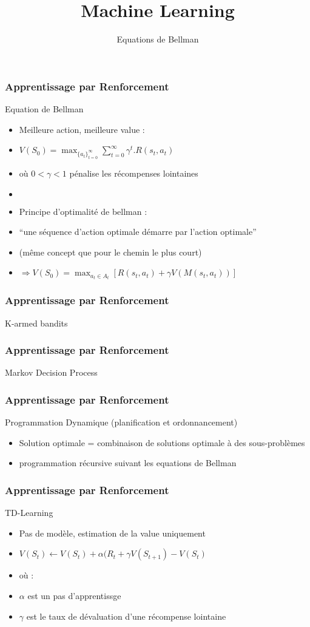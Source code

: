 \documentclass{formation}
\title{Machine Learning}
\subtitle{Equations de Bellman}
\begin{document}
\maketitle


\begin{frame}
  \frametitle{Apprentissage par Renforcement}
  Equation de Bellman
  \begin{itemize}
  \item Meilleure action, meilleure value :
  \item $V(S_0) = \max_{{\{a_t\}}_{t=0}^{\infty}}{\sum_{t=0}^{\infty}}\gamma^t.R(s_t,a_t)$
  \item où $0 < \gamma < 1$ pénalise les récompenses lointaines
  \item $\;$
  \item Principe d'optimalité de bellman :
  \item ``une séquence d'action optimale démarre par l'action optimale''
  \item (même concept que pour le chemin le plus court)
  \item $\Rightarrow V(S_0) = \max_{a_t \in A_t}[{R(s_t,a_t)+\gamma V(M(s_t,a_t))}]$
  \end{itemize}
\end{frame}



\begin{frame}
  \frametitle{Apprentissage par Renforcement}
  K-armed bandits
\end{frame}

\begin{frame}
  \frametitle{Apprentissage par Renforcement}
  Markov Decision Process
\end{frame}

\begin{frame}
  \frametitle{Apprentissage par Renforcement}
  Programmation Dynamique (planification et ordonnancement)
  \begin{itemize}
  \item Solution optimale = combinaison de solutions optimale à des sous-problèmes
  \item programmation récursive suivant les equations de Bellman
  \end{itemize}
\end{frame}

\begin{frame}
  \frametitle{Apprentissage par Renforcement}
  TD-Learning
  \begin{itemize}
  \item Pas de modèle, estimation de la value uniquement
  \item $V(S_t) \leftarrow V(S_t) + \alpha(R_t + \gamma V(S_{t+1})-V(S_t)$
  \item où :
  \item $\alpha$ est un pas d'apprentissge
  \item $\gamma$ est le taux de dévaluation d'une récompense lointaine
  \end{itemize}
\end{frame}
\end{document}

